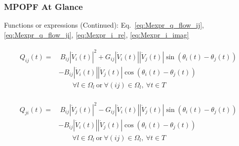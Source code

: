 \documentclass[
	11pt, %
	aspectratio=169, %
]{beamer}
\begin{document}
\begin{frame}
    \frametitle{MPOPF At Glance}
    
    Functions or expressions (Continued): Eq.~\eqref{eq:Mexpr_q_flow_ij},\eqref{eq:Mexpr_q_flow_ji}, \eqref{eq:Mexpr_i_re}, \eqref{eq:Mexpr_i_imag}
    
    \begin{align*}
        \begin{split}
            Q_{ij}(t) =&\ B_{ij}\left\lvert \dot{V}_{i}(t)\right\rvert^{2} + G_{ij}\left\lvert \dot{V}_{i}(t)\right\rvert\left\lvert \dot{V}_{j}(t)\right\rvert \sin{\left(\theta_{i}(t)-\theta_{j}(t)\right)} \\
            &- B_{ij}\left\lvert \dot{V}_{i}(t)\right\rvert\left\lvert \dot{V}_{j}(t)\right\rvert \cos{\left(\theta_{i}(t)-\theta_{j}(t)\right)}  \\
            &\qquad \forall l \in \Omega_{l} \ \text{or} \ \forall (ij) \in \Omega_{l},\ \forall t \in T
        \end{split}
    \end{align*}

	\begin{align*}
		\begin{split}
			Q_{ji}(t) =&\ B_{ij}\left\lvert \dot{V}_{j}(t)\right\rvert^{2} - G_{ij}\left\lvert \dot{V}_{i}(t)\right\rvert\left\lvert \dot{V}_{j}(t)\right\rvert \sin{\left(\theta_{i}(t)-\theta_{j}(t)\right)} \\
			&- B_{ij}\left\lvert \dot{V}_{i}(t)\right\rvert\left\lvert \dot{V}_{j}(t)\right\rvert \cos{\left(\theta_{i}(t)-\theta_{j}(t)\right)}  \\
			&\qquad \forall l \in \Omega_{l} \ \text{or} \ \forall (ij) \in \Omega_{l},\ \forall t \in T
		\end{split}
	\end{align*}
    

\end{frame}


\end{document}
